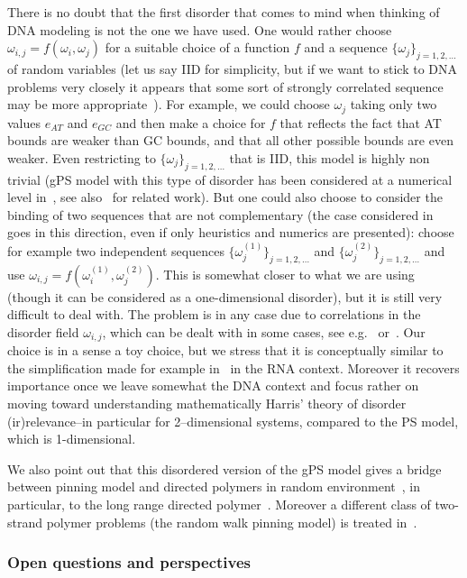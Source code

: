 \documentclass[AHL,Unicode,longabstracts]{cedram}
\newcommand{\go}{\omega}
\begin{document}
There is no doubt that the first disorder that comes to mind when thinking of DNA modeling is not the one we have used. One would rather choose $\go_{i,j}=f(\go_i, \go_j)$ for a suitable choice of a function $f$ and a sequence $\{\go_j\}_{j=1,2, \ldots}$ of random variables (let us say IID for simplicity, but if we want to stick to DNA problems very closely it appears that some sort of strongly correlated sequence may be more appropriate~\cite{cf:Peng}). For example, we could choose $\go_j$ taking only two values $e_{AT}$ and $e_{GC}$ and then make a choice for $f$ that reflects the fact that AT bounds are weaker than GC bounds, and that all other possible bounds are even weaker. Even restricting to $\{\go_j\}_{j=1,2, \ldots}$ that is IID, this model is highly non trivial (gPS model with this type of disorder has been considered at a numerical level in~\cite{cf:GOO,cf:GO04}, see also~\cite{cf:EON11,cf:TN08} for related work). But one could also choose to consider the binding of two sequences that are not complementary (the case considered in~\cite{cf:NG06} goes in this direction, even if only heuristics and numerics are presented): choose for example two independent sequences $\{\go^{(1)}_j\}_{j=1,2, \ldots}$ and $\{\go^{(2)}_j\}_{j=1,2, \ldots}$ and use $\go_{i,j}=f(\go^{(1)}_i, \go^{(2)}_j)$. This is somewhat closer to what we are using (though it can be considered as a one-dimensional disorder), but it is still very difficult to deal with. The problem is in any case due to correlations in the disorder field $\go_{i,j}$, which can be dealt with in some cases, see e.g.~\cite{cf:BL12,cf:BP15} or~\cite{cf:AB18, cf:CCP17}. Our choice is in a sense a toy choice, but we stress that it is conceptually similar to the simplification made for example in~\cite{cf:BundHwa} in the RNA context. Moreover it recovers importance once we leave somewhat the DNA context and focus rather on moving toward understanding mathematically Harris' theory of disorder (ir)relevance--in particular for 2--dimensional systems, compared to the PS model, which is 1-dimensional.

We also point out that this disordered version of the gPS model gives a bridge between pinning model and directed polymers in random environment~\cite{cf:Co07,cf:La10}, in particular, to the long range directed polymer~\cite{cf:Co07,cf:We15}. Moreover a different class of two-strand polymer problems (the random walk pinning model) is treated in~\cite{cf:BS1,cf:BS2,cf:BT10}.

\subsubsection{Open questions and perspectives}
\end{document}

